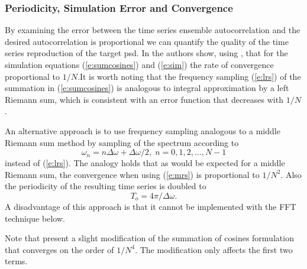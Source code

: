 \documentclass[techreport, article]{npsreport2018}
\begin{document}
\subsubsection{Periodicity, Simulation Error and Convergence}

By examining the error between the time series ensemble autocorrelation and the
desired autocorrelation is proportional we can quantify the quality of the time series reproduction of the target \ac{psd}. In \cite{shinozuka91simulation} the authors show, using \cite{conte17elementary},  that for the simulation equations (\ref{e:sumcosines}) and (\ref{e:sim}) the rate of convergence proportional to $1/N$.It is worth noting that the frequency sampling (\ref{e:lrs}) of the summation in (\ref{e:sumcosines}) is analogous to integral approximation by a left Riemann sum, which is consistent with an error function that decreases with $1/N$.

An alternative approach is to use frequency sampling analogous to a middle Riemann sum method by sampling of the spectrum according to 
\begin{equation}
  \omega_n = n \Delta \omega + \Delta \omega /2 , \; n=0,1,2,...,N-1
  \label{e:mrs}
\end{equation}
instead of (\ref{e:lrs}).
The analogy holds that as would be expected for a middle Riemann sum, the convergence when using (\ref{e:mrs}) is proportional to $1/N^2$.  Also the periodicity of the resulting time series is doubled to
\begin{equation}
  T_o = 4\pi / \Delta \omega.
  \label{e:to}
\end{equation}
A disadvantage of this approach is that it cannot be implemented with the FFT technique below.

Note that \cite{hu97simulation} present a slight modification of the summation of cosines formulation that converges on the order of $1/N^4$.  The modification only affects the first two terms.
\end{document}
